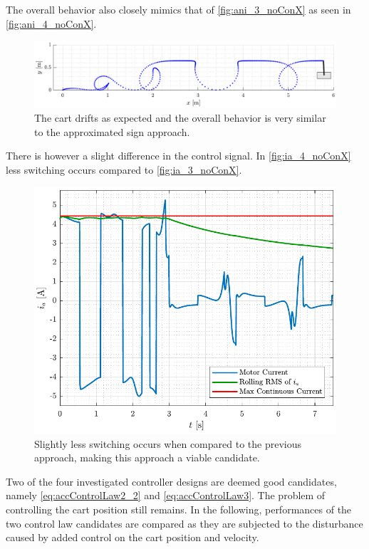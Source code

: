 %
The overall behavior also closely mimics that of \autoref{fig:ani_3_noConX} as seen in \autoref{fig:ani_4_noConX}.
\begin{figure}[H]
  \includegraphics[width=.7\textwidth]{figures/ani_4_noConX}
  \caption{The cart drifts as expected and the overall behavior is very similar to the approximated sign approach.}
  \label{fig:ani_4_noConX}
\end{figure}
%
There is however a slight difference in the control signal. In \autoref{fig:ia_4_noConX} less switching occurs compared to \autoref{fig:ia_3_noConX}. 
\begin{figure}[H]
  \includegraphics[width=.52\textwidth]{figures/ia_4_noConX}
  \caption{Slightly less switching occurs when compared to the previous approach, making this approach a viable candidate.}
  \label{fig:ia_4_noConX}
\end{figure}
%
Two of the four investigated controller designs are deemed good candidates, namely \autoref{eq:accControlLaw2_2} and \autoref{eq:accControlLaw3}. The problem of controlling the cart position still remains. In the following, performances of the two control law candidates are compared as they are subjected to the disturbance caused by added control on the cart position and velocity.
%
%
